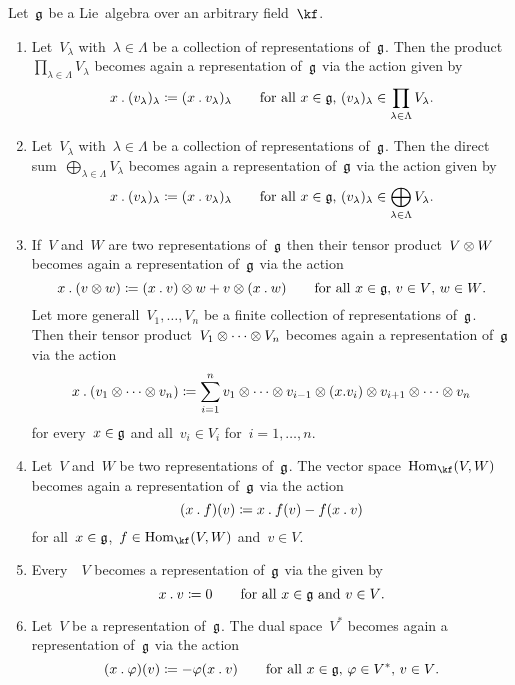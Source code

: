 \begin{proposition}
  \label{new representations from old ones}
  Let~$\mathfrak{g}$ be a Lie~algebra over an arbitrary field~$\kf$.
  \begin{enumerate}
    \item
      Let~$V_\lambda$ with~$\lambda \in \Lambda$ be a collection of representations of~$\mathfrak{g}$.
      Then the product~$\prod_{\lambda \in \Lambda} V_\lambda$ becomes again a representation of~$\mathfrak{g}$ via the action given by
      \[
        x \mathbin{.} (v_\lambda)_\lambda
        \coloneqq
        ( x \mathbin{.} v_\lambda )_\lambda
        \qquad
        \text{for all~$x \in \mathfrak{g}$,~$(v_\lambda)_\lambda \in \prod_{\lambda \in \Lambda} V_\lambda$.}
      \]
    \item
      Let~$V_\lambda$ with~$\lambda \in \Lambda$ be a collection of representations of~$\mathfrak{g}$.
      Then the direct sum~$\bigoplus_{\lambda \in \Lambda} V_\lambda$ becomes again a representation of~$\mathfrak{g}$ via the action given by
      \[
        x \mathbin{.} (v_\lambda)_\lambda
        \coloneqq
        ( x \mathbin{.} v_\lambda )_\lambda
        \qquad
        \text{for all~$x \in \mathfrak{g}$,~$(v_\lambda)_\lambda \in \bigoplus_{\lambda \in \Lambda} V_\lambda$.}
      \]
    \item
      If~$V$ and~$W$ are two representations of~$\mathfrak{g}$ then their tensor product~$V \otimes W$ becomes again a representation of~$\mathfrak{g}$ via the action
      \[
        x \mathbin{.} (v \otimes w)
        \coloneqq
        (x \mathbin{.} v) \otimes w + v \otimes (x \mathbin{.} w)
        \qquad
        \text{for all~$x \in \mathfrak{g}$,~$v \in V$,~$w \in W$.}
      \]
      Let more generall~$V_1, \dotsc, V_n$ be a finite collection of representations of~$\mathfrak{g}$.
      Then their tensor product~$V_1 \otimes \dotsb \otimes V_n$ becomes again a representation of~$\mathfrak{g}$ via the action
      \[
        x \mathbin{.} (v_1 \otimes \dotsb \otimes v_n)
        \coloneqq
        \sum_{i=1}^n
                v_1
        \otimes \dotsb
        \otimes v_{i-1}
        \otimes (x.v_i)
        \otimes v_{i+1}
        \otimes \dotsb
        \otimes v_n
      \]
      for every~$x \in \mathfrak{g}$ and all~$v_i \in V_i$ for~$i = 1, \dotsc, n$.
    \item
      Let~$V$ and~$W$ be two representations of~$\mathfrak{g}$.
      The vector space~$\Hom_{\kf}(V,W)$ becomes again a representation of~$\mathfrak{g}$ via the action
      \[
        (x \mathbin{.} f)(v)
        \coloneqq
        x \mathbin{.} f(v) - f(x \mathbin{.} v)
      \]
      for all~$x \in \mathfrak{g}$,~$f \in \Hom_{\kf}(V,W)$ and~$v \in V$.
    \item
      Every~{\vectorspace{$\kf$}}~$V$ becomes a representation of~$\mathfrak{g}$ via the  given by
      \[
        x \mathbin{.} v
        \coloneqq
        0
        \qquad
        \text{for all~$x \in \mathfrak{g}$ and~$v \in V$.}
      \]
    \item
      Let~$V$ be a representation of~$\mathfrak{g}$.
      The dual space~$V^*$ becomes again a representation of~$\mathfrak{g}$ via the action
      \[
        (x \mathbin{.} \varphi)(v)
        \coloneqq
        - \varphi(x \mathbin{.} v)
        \qquad
        \text{for all~$x \in \mathfrak{g}$,~$\varphi \in V^*$,~$v \in V$.}
      \]
  \end{enumerate}
\end{proposition}


